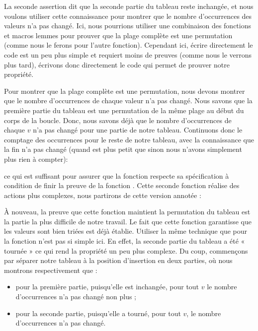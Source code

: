 La seconde assertion dit que la seconde partie du tableau reste inchangée, et nous
voulons utiliser cette connaissance pour montrer que le nombre d'occurrences des
valeurs n'a pas changé. Ici, nous pourrions utiliser une combinaison des
fonctions et macros lemmes pour prouver que la plage complète est une
permutation (comme nous le ferons pour l'autre fonction). Cependant ici, écrire
directement le code est un peu plus simple et requiert moins de preuves (comme
nous le verrons plus tard), écrivons donc directement le code qui permet de
prouver notre propriété.


Pour montrer que la plage complète est une permutation, nous devons montrer que le
nombre d'occurrences de chaque valeur n'a pas changé. Nous savons que la première
partie du tableau est une permutation de la même plage au début du corps de la
boucle. Donc, nous savons déjà que le nombre d'occurrences de chaque $v$ n'a pas
changé pour une partie de notre tableau. Continuons donc le comptage des
occurrences pour le reste de notre tableau, avec la connaissance que la fin n'a
pas changé (quand  est plus petit que  sinon
nous n'avons simplement plus rien à compter):




ce qui est suffisant pour assurer que la fonction 
respecte sa spécification à condition de finir la preuve de la fonction
. Cette seconde fonction réalise des actions plus
complexes, nous partirons de cette version annotée :




À nouveau, la preuve que cette fonction maintient la permutation du tableau est
la partie la plus difficile de notre travail. Le fait que cette fonction
garantisse que les valeurs sont bien triées est déjà établie. Utiliser la
même technique que pour la fonction  n'est pas si
simple ici. En effet, la seconde partie du tableau a été « tournée » ce qui 
rend la propriété un peu plus complexe. Du coup, commençons par séparer notre
tableau à la position d'insertion en deux parties, où nous montrons
respectivement que :


\begin{itemize}
    \item pour la première partie, puisqu'elle est inchangée, pour tout $v$
          le nombre d'occurrences n'a pas changé non plus ;
    \item pour la seconde partie, puisqu'elle a tourné, pour tout $v$, le
          nombre d'occurrences n'a pas changé.
\end{itemize}


